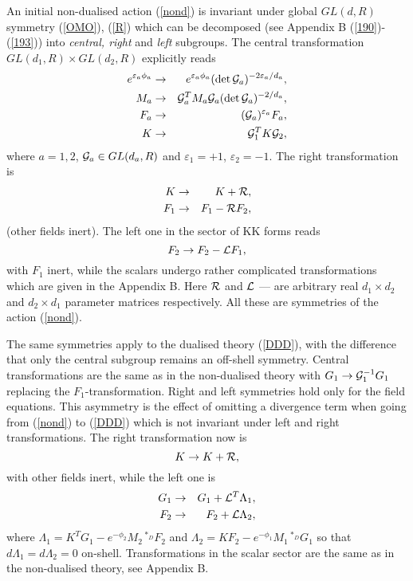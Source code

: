 \documentclass[a4paper,12pt]{article}
\begin{document}
An initial non-dualised action (\ref{nond}) is invariant under
global $GL(d,R)$ symmetry (\ref{OMO}), (\ref{R}) which can be
decomposed (see Appendix B (\ref{190})-(\ref{193})) into {\it
central, right} and {\it left} subgroups. The central
transformation $GL(d_1,R)\times GL(d_2,R)$ explicitly reads
\begin{eqnarray}
e^{\varepsilon_a\phi_a} &\to& e^{\varepsilon_a\phi_a}(\det {\cal
G}_a)^{-2\varepsilon_a/d_a}, \label{centr}\\
M_a &\to& {\cal G}_a^T M_a {\cal G}_a (\det {\cal G}_a)^{-2/d_a},\\
F_a &\to& ({\cal G}_a)^{\varepsilon_a} F_a, \\
K &\to& {\cal G}_1^T K{\cal G}_2, \label{cenkon}
\end{eqnarray}
where $a=1,2$, ${\cal G}_a\in GL(d_a,R)$ and $\varepsilon_1=+1$,
$\varepsilon_2=-1$. The right transformation is
\begin{eqnarray}
K &\to& K + {\cal R}, \\
F_1 &\to& F_1 - {\cal R} F_2,
\end{eqnarray}
(other fields inert). The left one in the sector of KK forms reads
\begin{equation}\label{l}
F_2 \to F_2 - {\cal L} F_1,
\end{equation}
with $F_1$ inert, while the scalars undergo rather complicated
transformations which are given in the Appendix B. Here ${\cal
R}$ and ${\cal L}$ --- are arbitrary real $d_1\times d_2$ and
$d_2\times d_1$ parameter matrices respectively. All these
 are symmetries of the action (\ref{nond}).

The same symmetries apply to the dualised theory (\ref{DDD}),
with the difference that only the central subgroup remains an
off-shell symmetry. Central transformations are the same as in
the non-dualised theory with $G_1\to {\cal G}_1^{-1}G_1$
replacing the $F_1$-transformation. Right and left symmetries hold
only for the field equations. This asymmetry is the effect of
omitting a divergence term when going from (\ref{nond}) to
(\ref{DDD}) which is not invariant under left and right
transformations. The right transformation now is
\begin{equation}\label{rd}
K \to K + {\cal R},
\end{equation}
with other fields inert, while the left one is
\begin{eqnarray}
G_1 &\to& G_1 + {\cal L}^T \Lambda_1, \\
F_2 &\to& F_2 + {\cal L} \Lambda_2, \label{ld}
\end{eqnarray}
where $\Lambda_1=K^T G_1 - e^{-\phi_2} M_2\,{}^{*_D} F_2$ and
$\Lambda_2=K F_2 - e^{-\phi_1}M_1\,{}^{*_D} G_1$ so that
$d\Lambda_1=d\Lambda_2=0$ on-shell. Transformations in the
scalar sector are the same as in the non-dualised theory, see
Appendix B.
\end{document}
